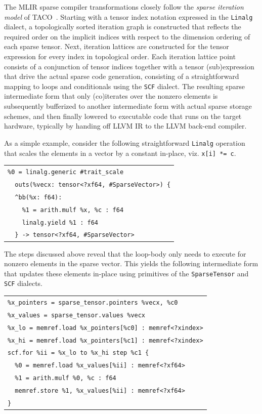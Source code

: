 \documentclass[10pt]{article}
\newcommand{\exam}{\begin{flushleft}\scriptsize\begin{tabular}{l}}
\newcommand{\maxe}{\end{tabular}\end{flushleft}}
\begin{document}
The MLIR sparse compiler transformations closely follow the \emph{sparse iteration model} of TACO~\cite{drkjolstad}. Starting with a tensor index notation expressed in the \texttt{Linalg} dialect, a topologically sorted iteration graph is constructed that reflects the required order on the implicit indices with respect to the dimension ordering of each sparse tensor. Next, iteration lattices are constructed for the tensor expression for every index in topological order. Each iteration lattice point consists of a conjunction of tensor indices together with a tensor (sub)expression that drive the actual sparse code generation, consisting of a straightforward mapping to loops and conditionals using the \texttt{SCF} dialect. The resulting sparse intermediate form that only (co)iterates over the nonzero elements is subsequently bufferized to another intermediate form with actual sparse storage schemes, and then finally lowered to executable code that runs on the target hardware, typically by handing off LLVM IR to the LLVM back-end compiler.

As a simple example, consider the following straightforward \texttt{Linalg} operation that scales the elements in a vector by a constant in-place, viz. \texttt{x[i] *= c}.

\exam
\verb"%0 = linalg.generic #trait_scale" \\
\verb"  outs(%vecx: tensor<?xf64, #SparseVector>) {" \\
\verb"  ^bb(%x: f64):" \\
\verb"    %1 = arith.mulf %x, %c : f64" \\
\verb"    linalg.yield %1 : f64" \\
\verb"  } -> tensor<?xf64, #SparseVector>" \\
\maxe

The steps discussed above reveal that the loop-body only needs to execute for nonzero elements in the sparse vector. This yields the following intermediate form that updates these elements in-place using primitives of the \texttt{SparseTensor} and \texttt{SCF} dialects. 

\exam
\verb"%x_pointers = sparse_tensor.pointers %vecx, %c0" \\
\verb"%x_values = sparse_tensor.values %vecx" \\
\verb"%x_lo = memref.load %x_pointers[%c0] : memref<?xindex>" \\
\verb"%x_hi = memref.load %x_pointers[%c1] : memref<?xindex>" \\
\verb"scf.for %ii = %x_lo to %x_hi step %c1 {" \\
\verb"  %0 = memref.load %x_values[%ii] : memref<?xf64>" \\
\verb"  %1 = arith.mulf %0, %c : f64" \\
\verb"  memref.store %1, %x_values[%ii] : memref<?xf64>" \\
\verb"}"
\maxe
\end{document}
